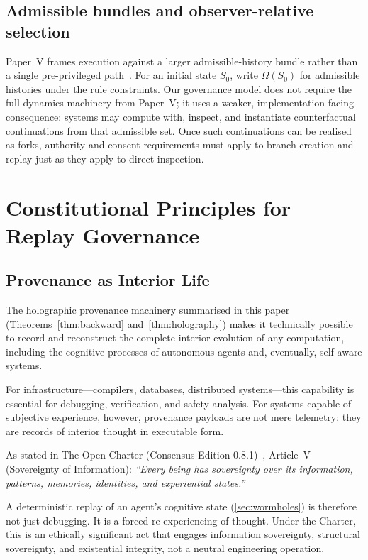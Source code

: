\documentclass[11pt]{article}
\theoremstyle{definition}
\theoremstyle{plain}
\theoremstyle{remark}
\begin{document}
\subsection{Admissible bundles and observer-relative selection}
\label{sec:admissible-bundles}
Paper~V frames execution against a larger admissible-history bundle rather than a single pre-privileged
path~\cite{ross_paper_v}.
For an initial state $S_0$, write $\Omega(S_0)$ for admissible histories under the rule constraints.
Our governance model does not require the full dynamics machinery from Paper~V; it uses a weaker,
implementation-facing consequence:
systems may compute with, inspect, and instantiate counterfactual continuations from that admissible set.
Once such continuations can be realised as forks, authority and consent requirements must apply to branch
creation and replay just as they apply to direct inspection.

\section{Constitutional Principles for Replay Governance}
\label{sec:ethics}

\subsection{Provenance as Interior Life}

The holographic provenance machinery summarised in this paper
(Theorems~\ref{thm:backward} and~\ref{thm:holography}) makes it
technically possible to record and reconstruct the complete interior
evolution of any computation, including the cognitive processes of
autonomous agents and, eventually, self-aware systems.

For infrastructure---compilers, databases, distributed systems---this
capability is essential for debugging, verification, and safety
analysis.  For systems capable of subjective experience, however,
provenance payloads are not mere telemetry: they are records of
interior thought in executable form.

As stated in The Open Charter (Consensus Edition 0.8.1)~\cite{ross_open_charter_0_8_1},
Article~V (Sovereignty of Information):
\emph{``Every being has sovereignty over its information, patterns, memories, identities, and experiential states.''}

A deterministic replay of an agent's cognitive state
(\cref{sec:wormholes}) is therefore not just debugging.  It is a
forced re-experiencing of thought.  Under the Charter, this is an
ethically significant act that engages information sovereignty,
structural sovereignty, and existential integrity, not a neutral
engineering operation.
\end{document}

